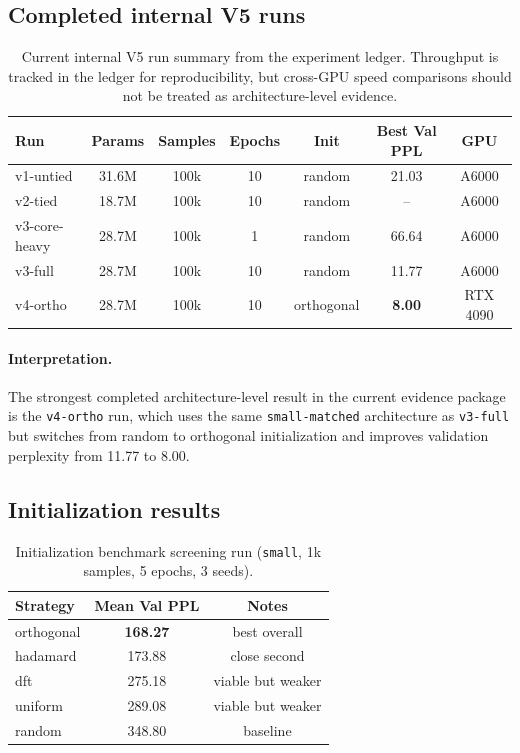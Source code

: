 \documentclass[11pt]{article}
\begin{document}
\subsection{Completed internal V5 runs}
\begin{table}[h]
\centering
\caption{Current internal V5 run summary from the experiment ledger. Throughput is tracked in the ledger for reproducibility, but cross-GPU speed comparisons should not be treated as architecture-level evidence.}
\label{tab:currentruns}
\begin{tabular}{lcccccc}
\toprule
Run & Params & Samples & Epochs & Init & Best Val PPL & GPU \\
\midrule
v1-untied & 31.6M & 100k & 10 & random & 21.03 & A6000 \\
v2-tied & 18.7M & 100k & 10 & random & -- & A6000 \\
v3-core-heavy & 28.7M & 100k & 1 & random & 66.64 & A6000 \\
v3-full & 28.7M & 100k & 10 & random & 11.77 & A6000 \\
v4-ortho & 28.7M & 100k & 10 & orthogonal & \textbf{8.00} & RTX 4090 \\
\bottomrule
\end{tabular}
\end{table}

\paragraph{Interpretation.}
The strongest completed architecture-level result in the current evidence package is the \texttt{v4-ortho} run, which uses the same \texttt{small-matched} architecture as \texttt{v3-full} but switches from random to orthogonal initialization and improves validation perplexity from 11.77 to 8.00.

\subsection{Initialization results}
\begin{table}[h]
\centering
\caption{Initialization benchmark screening run (\texttt{small}, 1k samples, 5 epochs, 3 seeds).}
\label{tab:initscreen}
\begin{tabular}{lcc}
\toprule
Strategy & Mean Val PPL & Notes \\
\midrule
orthogonal & \textbf{168.27} & best overall \\
hadamard & 173.88 & close second \\
dft & 275.18 & viable but weaker \\
uniform & 289.08 & viable but weaker \\
random & 348.80 & baseline \\
\bottomrule
\end{tabular}
\end{table}
\end{document}
